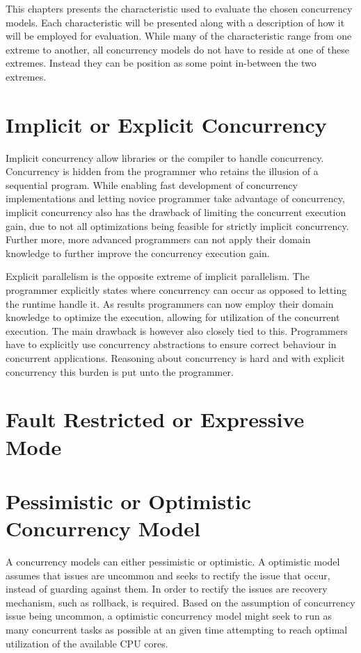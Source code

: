 \makeatletter {}\makeatother
{}
This chapters presents the characteristic used to evaluate the chosen concurrency models.  Each characteristic will be presented along with a description of how it will be employed for evaluation. While many of the characteristic range from one extreme to another, all concurrency models do not have to reside at one of these extremes. Instead they can be position as some point in-between the two extremes.
\label{chap:char}
\section{Implicit or Explicit Concurrency}
Implicit concurrency allow libraries or the compiler to handle concurrency. Concurrency is hidden from the programmer who retains the illusion of a sequential program\cite[p. 59]{sutter2005software}. While enabling fast development of concurrency implementations and letting novice programmer take advantage of concurrency, implicit concurrency also has the drawback of limiting the concurrent execution gain, due to not all optimizations being feasible for strictly implicit concurrency. Further more, more advanced programmers can not apply their domain knowledge to further improve the concurrency execution gain.

Explicit parallelism is the opposite extreme of implicit parallelism. The programmer explicitly states where concurrency can occur as opposed to letting the runtime handle it\cite[p. 59]{sutter2005software}. As results programmers can now employ their domain knowledge to optimize the execution, allowing for utilization of the concurrent execution. The main drawback is however also closely tied to this. Programmers have to explicitly use concurrency abstractions to ensure correct behaviour in concurrent applications. Reasoning about concurrency is hard\cite[p. 56]{sutter2005software} and with explicit concurrency this burden is put unto the programmer.
\section{Fault Restricted or Expressive Mode}
\section{Pessimistic or Optimistic Concurrency Model}
A concurrency models can either pessimistic or optimistic. A optimistic model assumes that issues are uncommon and seeks to rectify the issue that occur, instead of guarding against them. In order to rectify the issues are recovery mechanism, such as rollback, is required. Based on the assumption of concurrency issue being uncommon, a optimistic concurrency model might seek to run as many concurrent tasks as possible at an given time attempting to reach optimal utilization of the available \ac{CPU} cores. 

